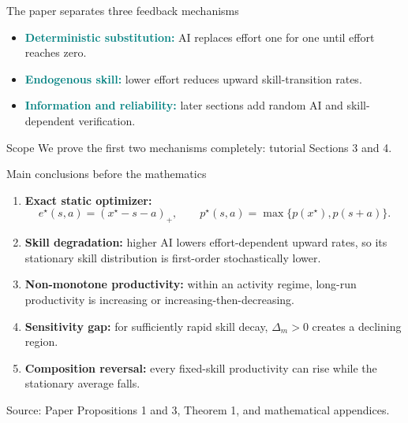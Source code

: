 \documentclass[aspectratio=169,10pt]{beamer}
\newcommand{\pos}[1]{\left(#1\right)_{+}}
\newcommand{\key}[1]{\textcolor{teal}{\textbf{#1}}}
\newcommand{\source}[1]{\vfill{\scriptsize\color{muted}Source: #1}}
\begin{document}
\begin{frame}{The paper separates three feedback mechanisms}
\centering
{}
\vspace{3mm}
\begin{itemize}
  \item \key{Deterministic substitution:} AI replaces effort one for one until effort reaches zero.
  \item \key{Endogenous skill:} lower effort reduces upward skill-transition rates.
  \item \key{Information and reliability:} later sections add random AI and skill-dependent verification.
\end{itemize}
\begin{alertblock}{Scope}
We prove the first two mechanisms completely: tutorial Sections 3 and 4.
\end{alertblock}
\end{frame}

\begin{frame}{Main conclusions before the mathematics}
\begin{enumerate}
  \item \textbf{Exact static optimizer:}
  \[
  e^\star(s,a)=\pos{x^\star-s-a},
  \qquad
  p^\star(s,a)=\max\{p(x^\star),p(s+a)\}.
  \]
  \item \textbf{Skill degradation:} higher AI lowers effort-dependent upward rates, so its stationary skill distribution is first-order stochastically lower.
  \item \textbf{Non-monotone productivity:} within an activity regime, long-run productivity is increasing or increasing-then-decreasing.
  \item \textbf{Sensitivity gap:} for sufficiently rapid skill decay, $\Delta_m>0$ creates a declining region.
  \item \textbf{Composition reversal:} every fixed-skill productivity can rise while the stationary average falls.
\end{enumerate}
\source{Paper Propositions 1 and 3, Theorem 1, and mathematical appendices.}
\end{frame}
\end{document}
